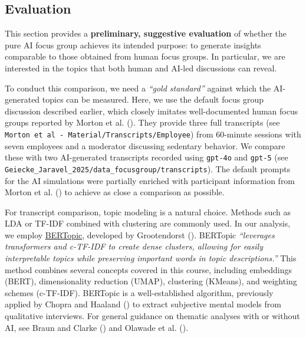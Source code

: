 \documentclass[
  letterpaper,
  DIV=11,
  numbers=noendperiod]{scrartcl}
\begin{document}
\subsection{Evaluation}\label{sec-evaluation}

This section provides a \textbf{preliminary, suggestive evaluation} of
whether the pure AI focus group achieves its intended purpose: to
generate insights comparable to those obtained from human focus groups.
In particular, we are interested in the topics that both human and
AI-led discussions can reveal.

To conduct this comparison, we need a \emph{``gold standard''} against
which the AI-generated topics can be measured. Here, we use the default
focus group discussion described earlier, which closely imitates
well-documented human focus groups reported by Morton et al.
().
They provide three full transcripts (see
\texttt{Morton\ et\ al\ -\ Material/Transcripts/Employee}) from
60-minute sessions with seven employees and a moderator discussing
sedentary behavior. We compare these with two AI-generated transcripts
recorded using \texttt{gpt-4o} and \texttt{gpt-5} (see
\texttt{Geiecke\_Jaravel\_2025/data\_focusgroup/transcripts}). The
default prompts for the AI simulations were partially enriched with
participant information from Morton et al.
()
to achieve as close a comparison as possible.

For transcript comparison, topic modeling is a natural choice. Methods
such as LDA or TF-IDF combined with clustering are commonly used. In our
analysis, we employ
\href{https://maartengr.github.io/BERTopic/index.html}{BERTopic},
developed by Grootendorst ().
BERTopic \emph{``leverages transformers and c-TF-IDF to create dense
clusters, allowing for easily interpretable topics while preserving
important words in topic descriptions.''} This method combines several
concepts covered in this course, including embeddings (BERT),
dimensionality reduction (UMAP), clustering (KMeans), and weighting
schemes (c-TF-IDF). BERTopic is a well-established algorithm, previously
applied by Chopra and Haaland ()
to extract subjective mental models from qualitative interviews. For
general guidance on thematic analyses with or without AI, see Braun and
Clarke () and Olawade et al.
().
\end{document}
